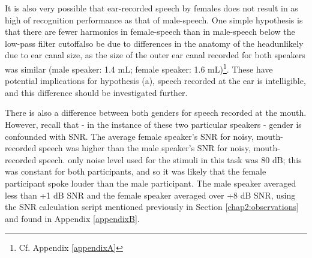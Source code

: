 It is also very possible that ear-recorded speech by females does not result in as high of recognition performance as that of male-speech.  One simple hypothesis is that there are fewer harmonics in female-speech than in male-speech below the low-pass filter cutoff\DIFdelbegin {}\DIFdelend \DIFaddbegin {}\DIFaddend also be due to differences in the anatomy of the head\DIFdelbegin {}\DIFdelend \DIFaddbegin {}\DIFaddend unlikely due to ear canal size, as the size of the outer ear canal recorded for both speakers was \DIFdelbegin {}\DIFdelend \DIFaddbegin {}\DIFaddend similar (male speaker: 1.4 mL; female speaker: 1.6 mL)\footnote{Cf. Appendix \ref{appendixA}}.  These have potential implications for hypothesis (a), \DIFdelbegin {}\DIFdelend \DIFaddbegin {}\DIFaddend speech recorded at the ear is intelligible, and this difference should be investigated further.
%
%

There is also a difference between both genders for speech recorded at the mouth.
However, recall that - in the instance of these two particular speakers - gender is confounded with SNR.  The average female speaker's SNR for noisy, mouth-recorded speech was higher than the male speaker's SNR for noisy, mouth-recorded speech.  \DIFdelbegin {}\DIFdelend \DIFaddbegin {}\DIFaddend only noise level used for the stimuli in this task was 80 dB; this was constant for both participants, and so it was likely that the female participant spoke louder than the male participant.  The male speaker averaged less than +1 dB SNR and the female speaker averaged over +8 dB SNR, using the SNR calculation script mentioned previously in Section \ref{chap2:observations} and found in Appendix \DIFdelbegin {}\DIFdelend \ref{appendixB}.

